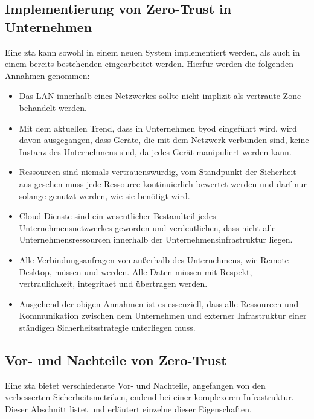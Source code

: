 \subsection{Implementierung von Zero-Trust in Unternehmen}\label{subsec:implementierung-von-zero-trust-in-unternehmen}
Eine \ac{zta} kann sowohl in einem neuen System implementiert werden, als auch in einem bereits bestehenden eingearbeitet werden.
Hierfür werden die folgenden Annahmen genommen:\autocite[\vglf][]{dsilvia-2021}
\begin{itemize}
    \item Das LAN innerhalb eines Netzwerkes sollte nicht implizit als vertraute Zone behandelt werden.
    \item Mit dem aktuellen Trend, dass in Unternehmen \ac{byod} eingeführt wird, wird davon ausgegangen, dass Geräte, die mit dem Netzwerk verbunden sind, keine Instanz des Unternehmens sind, da jedes Gerät manipuliert werden kann.
    \item Ressourcen sind niemals vertrauenswürdig, \dah vom Standpunkt der Sicherheit aus gesehen muss jede Ressource kontinuierlich bewertet werden und darf nur solange genutzt werden, wie sie benötigt wird.
    \item Cloud-Dienste sind ein wesentlicher Bestandteil jedes Unternehmensnetzwerkes geworden und verdeutlichen, dass nicht alle Unternehmensressourcen innerhalb der Unternehmensinfrastruktur liegen.
    \item Alle Verbindungsanfragen von außerhalb des Unternehmens, wie \zb Remote Desktop, müssen  und  werden.
    Alle Daten müssen mit Respekt, \gls{vertraulichkeit}, \gls{integritaet} und  übertragen werden.
    \item Ausgehend der obigen Annahmen ist es essenziell, dass alle Ressourcen und Kommunikation zwischen dem Unternehmen und externer Infrastruktur einer ständigen Sicherheitsstrategie unterliegen muss.
\end{itemize}

\subsection{Vor- und Nachteile von Zero-Trust}\label{subsec:vor-und-nachteile-von-zero-trust}
Eine \ac{zta} bietet verschiedenste Vor- und Nachteile, angefangen von den verbesserten Sicherheitsmetriken, endend bei einer komplexeren Infrastruktur.
Dieser Abschnitt listet und erläutert einzelne dieser Eigenschaften.

